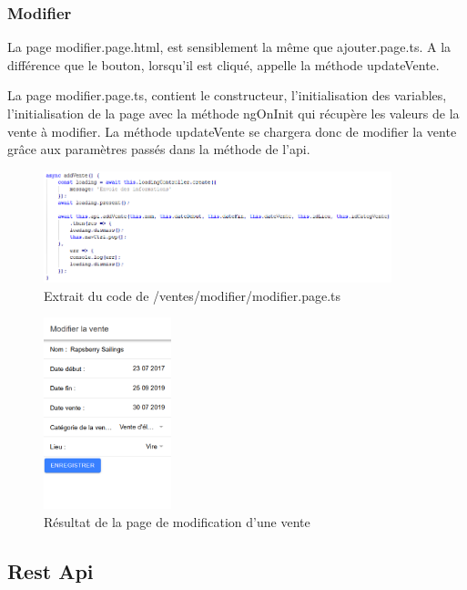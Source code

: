 			\subsubsection{Modifier}

			La page modifier.page.html, est sensiblement la même que ajouter.page.ts. A la différence que le bouton, lorsqu'il est cliqué, appelle la méthode updateVente.

			La page modifier.page.ts, contient le constructeur, l'initialisation des variables, l'initialisation de la page avec la méthode ngOnInit qui récupère les valeurs de la vente à modifier.\newline
			La méthode updateVente se chargera donc de modifier la vente grâce aux paramètres passés dans la méthode de l'api.

			\begin{figure}[H]
				\centering\includegraphics[width=0.9\textwidth, keepaspectratio]{res/ajouterTs.png}
				\caption{Extrait du code de /ventes/modifier/modifier.page.ts}
			\end{figure}

			\begin{figure}[H]
				\centering\includegraphics[width=0.33\textwidth, keepaspectratio]{res/modifierVente.png}
				\caption{Résultat de la page de modification d'une vente}
			\end{figure}

		\subsection{Rest Api}

